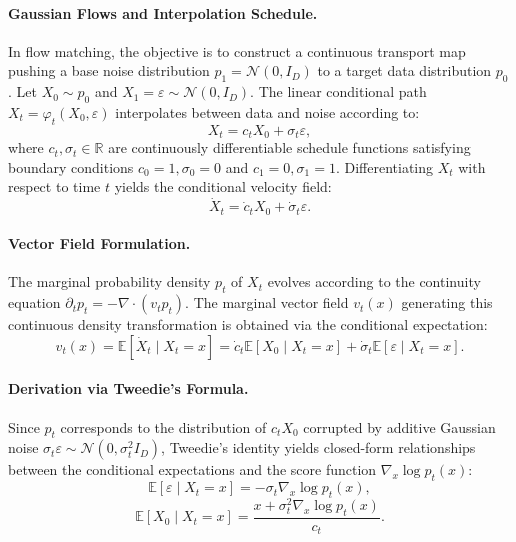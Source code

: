 \documentclass{article}
\theoremstyle{plain}
\theoremstyle{definition}
\theoremstyle{remark}
\begin{document}
\paragraph{Gaussian Flows and Interpolation Schedule.}
In flow matching, the objective is to construct a continuous transport map pushing a base noise distribution $p_1 = \mathcal{N}(0, I_D)$ to a target data distribution $p_0$. Let $X_0 \sim p_0$ and $X_1 = \varepsilon \sim \mathcal{N}(0, I_D)$. The linear conditional path $X_t = \varphi_t(X_0, \varepsilon)$ interpolates between data and noise according to:
\begin{equation}
X_t = c_t X_0 + \sigma_t \varepsilon,
\end{equation}
where $c_t, \sigma_t \in \mathbb{R}$ are continuously differentiable schedule functions satisfying boundary conditions $c_0 = 1, \sigma_0 = 0$ and $c_1 = 0, \sigma_1 = 1$. Differentiating $X_t$ with respect to time $t$ yields the conditional velocity field:
\begin{equation}
\dot{X}_t = \dot{c}_t X_0 + \dot{\sigma}_t \varepsilon.
\end{equation}

\paragraph{Vector Field Formulation.}
The marginal probability density $p_t$ of $X_t$ evolves according to the continuity equation $\partial_t p_t = -\nabla \cdot (v_t p_t)$. The marginal vector field $v_t(x)$ generating this continuous density transformation is obtained via the conditional expectation:
\begin{equation}
v_t(x) = \mathbb{E}\left[\dot{X}_t \mid X_t = x\right] = \dot{c}_t \mathbb{E}\left[X_0 \mid X_t = x\right] + \dot{\sigma}_t \mathbb{E}\left[\varepsilon \mid X_t = x\right].
\label{eq:vt-marginal}
\end{equation}

\paragraph{Derivation via Tweedie's Formula.}
Since $p_t$ corresponds to the distribution of $c_t X_0$ corrupted by additive Gaussian noise $\sigma_t \varepsilon \sim \mathcal{N}(0, \sigma_t^2 I_D)$, Tweedie's identity yields closed-form relationships between the conditional expectations and the score function $\nabla_x \log p_t(x)$:
\begin{equation}
\mathbb{E}\left[\varepsilon \mid X_t = x\right] = -\sigma_t \nabla_x \log p_t(x),
\label{eq:cond-eps}
\end{equation}
\begin{equation}
\mathbb{E}\left[X_0 \mid X_t = x\right] = \frac{x + \sigma_t^2 \nabla_x \log p_t(x)}{c_t}.
\label{eq:cond-x0}
\end{equation}
\end{document}

